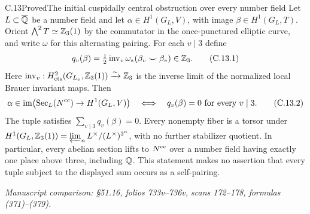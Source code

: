 \begin{statement}{C.13}{Proved}{The initial cuspidally central obstruction over every number field}
Let $L\subset\overline{\mathbb Q}$ be a number field and let
$\alpha\in H^1(G_L,V)$, with image $\beta\in H^1(G_L,T)$.
Orient $\bigwedge^2T\simeq\mathbb Z_3(1)$ by the commutator in
the once-punctured elliptic curve, and write $\omega$ for
this alternating pairing. For each $v\mid3$ define
\[
 q_v(\beta)=\tfrac12\operatorname{inv}_v
       \omega_*(\beta_v\smile\beta_v)\in\mathbb Z_3.
 \tag{C.13.1}
\]
Here $\operatorname{inv}_v:H^2_{\rm cts}(G_{L_v},\mathbb Z_3(1))
\xrightarrow{\sim}\mathbb Z_3$ is the inverse limit of the
normalized local Brauer invariant maps. Then
\[
 \alpha\in\operatorname{im}
   \bigl(\operatorname{Sec}_L(N^{\rm cc})\to H^1(G_L,V)\bigr)
 \quad\Longleftrightarrow\quad
             q_v(\beta)=0\text{ for every }v\mid3.
 \tag{C.13.2}
\]
The tuple satisfies $\sum_{v\mid3}q_v(\beta)=0$.
Every nonempty fiber is a torsor under
$H^1(G_L,\mathbb Z_3(1))=\varprojlim_n L^\times/(L^\times)^{3^n}$,
with no further stabilizer quotient. In particular, every
abelian section lifts to $N^{\rm cc}$ over a number field
having exactly one place above three, including $\mathbb Q$.
This statement makes no assertion that every tuple subject
to the displayed sum occurs as a self-pairing.
\par\smallskip\noindent\emph{Manuscript comparison: \S51.16,
folios 733v--736v, scans 172--178, formulas (371)--(379).}
\end{statement}
